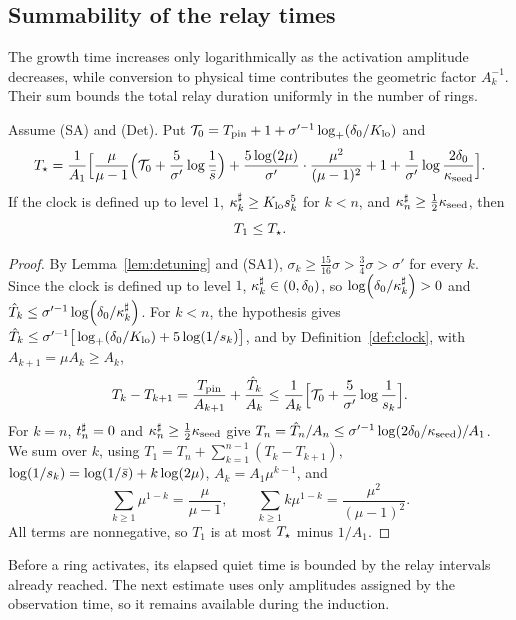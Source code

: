 \subsection{Summability of the relay times}
\label{sec:proof-time}

The growth time increases only logarithmically as the activation amplitude
decreases, while conversion to physical time contributes the geometric
factor $A_k^{-1}$. Their sum bounds the total relay duration uniformly in
the number of rings.

\begin{lemma}
\label{lem:time}
Assume (SA) and (Det). Put $\mathcal{T}_0=T_{\mathrm{pin}}+1+\sigma'^{-1}\log_+(\delta_0/K_{\mathrm{lo}})$ and
\[
T_\star=\frac1{A_1}\Big[\frac{\mu}{\mu-1}\Big(\mathcal{T}_0+\frac{5}{\sigma'}\log\frac1{\bar s}\Big)
+\frac{5\log(2\mu)}{\sigma'}\cdot\frac{\mu^2}{(\mu-1)^2}+1+\frac{1}{\sigma'}\log\frac{2\delta_0}{\kappa_{\mathrm{seed}}}\Big].
\]
If the clock is defined up to level $1$, $\kappa^\sharp_k\ge K_{\mathrm{lo}} s_k^5$ for $k<n$,
and $\kappa^\sharp_n\ge\frac12\kappa_{\mathrm{seed}}$, then
\begin{equation}
\label{eq:relay-total-time}
T_1\le T_\star.
\end{equation}
\end{lemma}

\begin{proof}
By Lemma~\ref{lem:detuning} and (SA1), $\sigma_k\ge\frac{15}{16}\sigma>\frac34\sigma>\sigma'$
for every $k$. Since the clock is defined up to level $1$, $\kappa^\sharp_k\in(0,\delta_0)$,
so $\log(\delta_0/\kappa^\sharp_k)>0$ and $\hat T_k\le\sigma'^{-1}\log(\delta_0/\kappa^\sharp_k)$. For
$k<n$, the hypothesis gives
$\hat T_k\le\sigma'^{-1}\big[\log_+(\delta_0/K_{\mathrm{lo}})+5\log(1/s_k)\big]$, and by
Definition~\ref{def:clock}, with $A_{k+1}=\mu A_k\ge A_k$,
\[
T_k-T_{k+1}=\frac{T_{\mathrm{pin}}}{A_{k+1}}+\frac{\hat T_k}{A_k}\le\frac1{A_k}\Big[\mathcal{T}_0+\frac{5}{\sigma'}\log\frac1{s_k}\Big].
\]
For $k=n$, $t^\sharp_n=0$ and $\kappa^\sharp_n\ge\frac12\kappa_{\mathrm{seed}}$ give
$T_n=\hat T_n/A_n\le\sigma'^{-1}\log(2\delta_0/\kappa_{\mathrm{seed}})/A_1$. We sum over $k$, using
$T_1=T_n+\sum_{k=1}^{n-1}(T_k-T_{k+1})$, $\log(1/s_k)=\log(1/\bar s)+k\log(2\mu)$,
$A_k=A_1\mu^{k-1}$, and
\[
\sum_{k\ge1}\mu^{1-k}=\frac\mu{\mu-1},\qquad\sum_{k\ge1}k\mu^{1-k}=\frac{\mu^2}{(\mu-1)^2}.
\]
All terms are nonnegative, so $T_1$ is at most $T_\star$ minus $1/A_1$.
\end{proof}

Before a ring activates, its elapsed quiet time is bounded by the relay
intervals already reached. The next estimate uses only amplitudes assigned
by the observation time, so it remains available during the induction.

